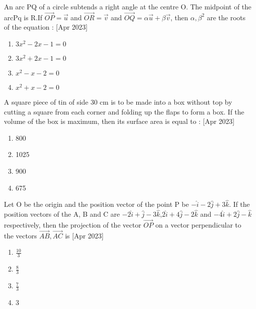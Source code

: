 \iffalse
  \title{2023}
  \author{ai24btech11005}
  \section{mcq-single}
\fi


    \item An arc PQ of a circle subtends a right angle at the centre O. The midpoint of the arcPq is R.If $\overrightarrow{OP}=\overrightarrow{u}$ and $\overrightarrow{OR}=\overrightarrow{v}$ and $\overrightarrow{OQ}=\alpha \overrightarrow{u}+\beta \overrightarrow{v}$, then $\alpha, \beta^2$ are the roots of the equation :
    \hfill{[Apr 2023]}
        \begin{multicols}{1}
            \begin{enumerate}
                \item $3x^2-2x-1=0$
                \item $3x^2+2x-1=0$
                \item $x^2-x-2=0$
                \item $x^2+x-2=0$
            \end{enumerate}
        \end{multicols}

    \item A square piece of tin of side 30 cm is to be made into a box without top by cutting a square from each corner
and folding up the flaps to form a box. If the volume of the box is maximum, then its surface area  is
equal to :
 \hfill{[Apr 2023]}

		\begin{multicols}{4}
			\begin{enumerate}
				\item 800
				\item  1025
				\item  900
				\item  675
			\end{enumerate}
		\end{multicols}

    \item Let O be the origin and the position vector of the point P be $-\hat{i}-2\hat{j}+3\hat{k}.$ If the position vectors of the A, B
and C are $-2\hat{i}+\hat{j}-3\hat{k}$,$2\hat{i}+4\hat{j}-2\hat{k}$ and $-4\hat{i}+2\hat{j}-\hat{k}$ respectively, then the projection of the vector $\overrightarrow{OP}$ on a vector perpendicular to the vectors $\overrightarrow{AB},\overrightarrow{AC}$ is 
 \hfill{[Apr 2023]}
        \begin{multicols}{4}
            \begin{enumerate}
              \item $\frac{10}{3}$
              \item $\frac{8}{3}$
              \item $\frac{7}{3}$
              \item $3$
            \end{enumerate}
        \end{multicols}

